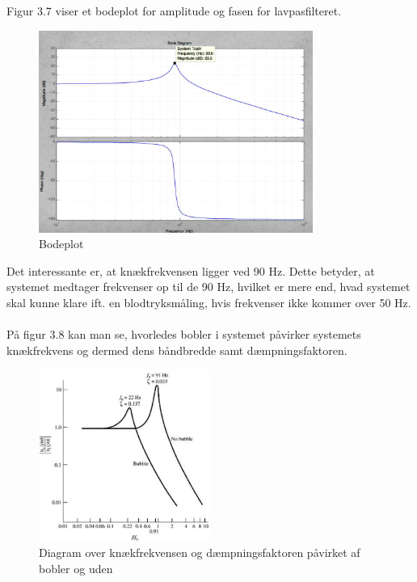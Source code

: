 Figur 3.7 viser et bodeplot for amplitude og fasen for lavpasfilteret.

\begin{figure}[H]
	\centering
	\includegraphics[width=0.8\textwidth]{Figurer/Snip20151207_61}
	\caption{Bodeplot}
\end{figure}

Det interessante er, at knækfrekvensen ligger ved 90 Hz. Dette betyder, at systemet medtager frekvenser op til de 90 Hz, hvilket er mere end, hvad systemet skal kunne klare ift. en blodtryksmåling, hvis frekvenser ikke kommer over 50 Hz.
\\\\ 

På figur 3.8 kan man se, hvorledes bobler i systemet påvirker systemets knækfrekvens og dermed dens båndbredde samt dæmpningsfaktoren.   

\begin{figure}[H]
	\centering
	\includegraphics[width=0.5\textwidth]{Figurer/Snip20151207_62}
	\caption{Diagram over knækfrekvensen og dæmpningsfaktoren påvirket af bobler og uden}
\end{figure}


